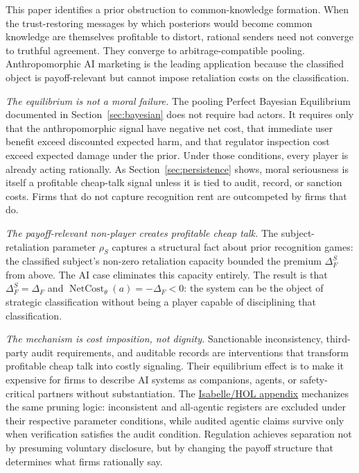 \documentclass[review,authoryear]{elsarticle}
\theoremstyle{definition}
\theoremstyle{plain}
\begin{document}
This paper identifies a prior obstruction to common-knowledge formation.  When the trust-restoring messages by which posteriors would become common knowledge are themselves profitable to distort, rational senders need not converge to truthful agreement.  They converge to arbitrage-compatible pooling.  Anthropomorphic AI marketing is the leading application because the classified object is payoff-relevant but cannot impose retaliation costs on the classification.

\emph{The equilibrium is not a moral failure.} The pooling Perfect Bayesian Equilibrium documented in Section~\ref{sec:bayesian} does not require bad actors. It requires only that the anthropomorphic signal have negative net cost, that immediate user benefit exceed discounted expected harm, and that regulator inspection cost exceed expected damage under the prior. Under those conditions, every player is already acting rationally. As Section~\ref{sec:persistence} shows, moral seriousness is itself a profitable cheap-talk signal unless it is tied to audit, record, or sanction costs. Firms that do not capture recognition rent are outcompeted by firms that do.

\emph{The payoff-relevant non-player creates profitable cheap talk.} The subject-retaliation parameter $\rho_S$ captures a structural fact about prior recognition games: the classified subject's non-zero retaliation capacity bounded the premium $\Delta_F^S$ from above. The AI case eliminates this capacity entirely. The result is that $\Delta_F^S=\Delta_F$ and $\operatorname{NetCost}_{\theta}(a)=-\Delta_F<0$: the system can be the object of strategic classification without being a player capable of disciplining that classification.

\begin{sloppypar}
\emph{The mechanism is cost imposition, not dignity.} Sanctionable inconsistency, third-party audit requirements, and auditable records are interventions that transform profitable cheap talk into costly signaling. Their equilibrium effect is to make it expensive for firms to describe AI systems as companions, agents, or safety-critical partners without substantiation. The \hyperref[app:isabelle]{Isabelle/HOL appendix} mechanizes the same pruning logic: inconsistent and all-agentic registers are excluded under their respective parameter conditions, while audited agentic claims survive only when verification satisfies the audit condition. Regulation achieves separation not by presuming voluntary disclosure, but by changing the payoff structure that determines what firms rationally say.
\end{sloppypar}
\end{document}
